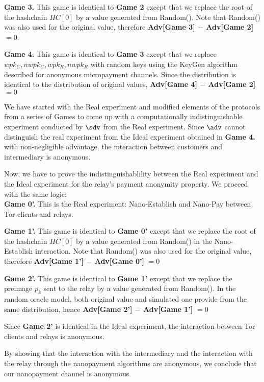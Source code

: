 \textbf{Game 3.} This game is identical to \textbf{Game 2} except that we replace the root of the hashchain $HC[0]$ by a value generated from Random(). Note that Random() was also used for the original value, therefore \textbf{Adv[Game 3] $-$ Adv[Game 2]} $= 0$.

\textbf{Game 4.} This game is identical to \textbf{Game 3} except that we replace $wpk_C, nwpk_C, wpk_R, nwpk_R$ with random keys using the KeyGen algorithm described for anonymous micropayment channels. Since the distribution is identical to the distribution of original values, \textbf{Adv[Game 4] $-$ Adv[Game 2]} $= 0$

We have started with the Real experiment and modified elements of the protocols from a series of Games to come up with a computationally indistinguishable experiment conducted by $\sdv$ from the Real experiment. Since $\adv$ cannot distinguish the real experiment from the Ideal experiment obtained in \textbf{Game 4.} with non-negligible advantage, the interaction between customers and intermediary is anonymous.

Now, we have to prove the indistinguishablility between the Real experiment and the Ideal experiment for the relay's payment anonymity property. We proceed with the same logic:\\

\textbf{Game 0'.} This is the Real experiment: Nano-Establish and Nano-Pay between Tor clients and relays.

\textbf{Game 1'.} This game is identical to \textbf{Game 0'} except that we replace the root of the hashchain $HC[0]$ by a value generated from Random() in the Nano-Establish interaction. Note that Random() was also used for the original value, therefore \textbf{Adv[Game 1'] $-$ Adv[Game 0']} $= 0$

\textbf{Game 2'.} This game is identical to \textbf{Game 1'} except that we replace the preimage $p_k$ sent to the relay by a value generated from Random(). In the random oracle model, both original value and simulated one provide from the same distribution, hence \textbf{Adv[Game 2'] $-$ Adv[Game 1']} $= 0$

Since \textbf{Game 2'} is identical in the Ideal experiment, the interaction between Tor clients and relays is anonymous.

By showing that the interaction with the intermediary and the interaction with the relay through the nanopayment algorithms are anonymous, we conclude that our nanopayment channel is anonymous.

